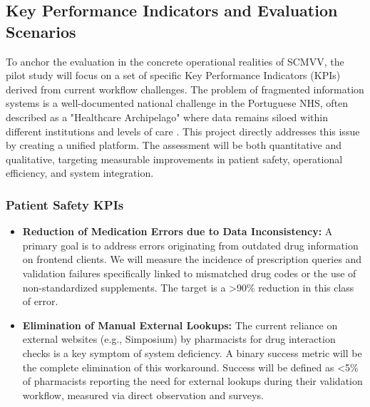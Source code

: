 \subsection{Key Performance Indicators and Evaluation Scenarios}

To anchor the evaluation in the concrete operational realities of SCMVV, the pilot study will focus on a set of specific Key Performance Indicators (KPIs) derived from current workflow challenges. The problem of fragmented information systems is a well-documented national challenge in the Portuguese NHS, often described as a "Healthcare Archipelago" where data remains siloed within different institutions and levels of care \cite{goiana2024portuguese, nunes2021articulacao}. This project directly addresses this issue by creating a unified platform. The assessment will be both quantitative and qualitative, targeting measurable improvements in patient safety, operational efficiency, and system integration.

\subsubsection{Patient Safety KPIs}
\begin{itemize}
    \item \textbf{Reduction of Medication Errors due to Data Inconsistency:} A primary goal is to address errors originating from outdated drug information on frontend clients. We will measure the incidence of prescription queries and validation failures specifically linked to mismatched drug codes or the use of non-standardized supplements. The target is a >90\% reduction in this class of error.
    \item \textbf{Elimination of Manual External Lookups:} The current reliance on external websites (e.g., Simposium) by pharmacists for drug interaction checks is a key symptom of system deficiency. A binary success metric will be the complete elimination of this workaround. Success will be defined as <5\% of pharmacists reporting the need for external lookups during their validation workflow, measured via direct observation and surveys.
\end{itemize}

